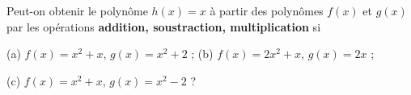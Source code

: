 Peut-on obtenir le polynôme $h(x) = x$ à partir des polynômes $f(x)$ et $g(x)$ par les opérations \textbf{addition, soustraction, multiplication} si

(a) $f(x) = x^2 + x$, $g(x) = x^2 + 2$ ; (b) $f(x) = 2x^2 + x$, $g(x) = 2x$ ;

(c) $f(x) = x^2 + x$, $g(x) = x^2 - 2$ ?
